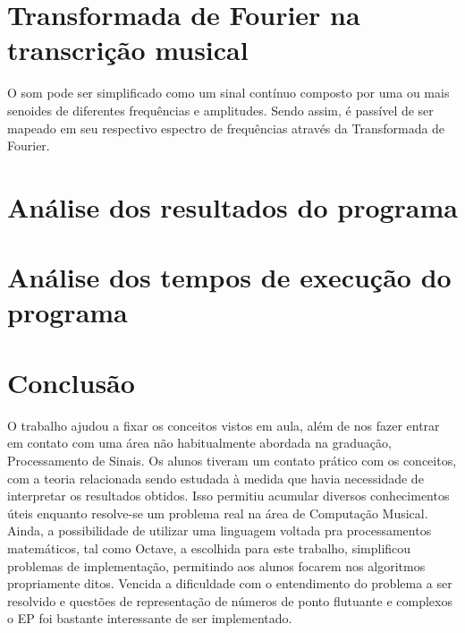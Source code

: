 \documentclass[brazil,times]{abnt}
\begin{document}
\section*{Transformada de Fourier na transcrição musical}
	O som pode ser simplificado como um sinal contínuo composto por uma ou mais senoides de diferentes frequências e amplitudes. Sendo assim, é passível de ser mapeado em seu respectivo espectro de frequências através da Transformada de Fourier.




\section*{Análise dos resultados do programa}

\section*{Análise dos tempos de execução do programa}



\section*{Conclusão}
	O trabalho ajudou a fixar os conceitos vistos em aula, além de nos fazer entrar em contato com uma área não habitualmente abordada na graduação, Processamento de Sinais. Os alunos tiveram um contato prático com os conceitos, com a teoria relacionada sendo estudada à medida que havia necessidade de interpretar os resultados obtidos. Isso permitiu acumular diversos conhecimentos úteis enquanto resolve-se um problema real na área de Computação Musical. Ainda, a possibilidade de utilizar uma linguagem voltada pra processamentos matemáticos, tal como Octave, a escolhida para este trabalho, simplificou problemas de implementação, permitindo aos alunos focarem nos algoritmos propriamente ditos. Vencida a dificuldade com o entendimento do problema a ser resolvido e questões de representação de números de ponto flutuante e complexos o EP foi bastante interessante de ser implementado.
	
%
%
\end{document}
